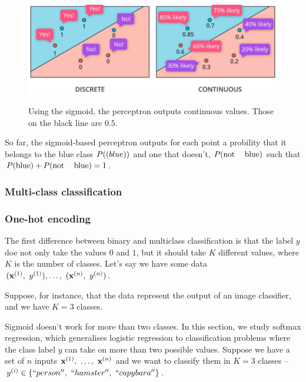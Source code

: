 \documentclass[a4paper]{article}
\begin{document}
\begin{figure}[H]
    \centering
    \includegraphics[height=4.75cm]{img/blue_red_example_valsPNG.PNG}
    \caption{Using the sigmoid, the perceptron outputs continuous values. Those on the black line are $0.5$.}
\end{figure}
So far, the sigmoid-based perceptron outputs for each point a probility that it belongs to the blue class $P(\textup(blue))$ and one that doesn't, $P(\textup{not \;\; blue})$ such that $P(\textup{blue}) + P(\textup{not \;\; blue})=1$.



\subsubsection{Multi-class classification}

\subsubsection{One-hot encoding}

The first difference between binary and multiclass classification is that the label $y$ doe not only take the values $0$ and $1$, but it should take $K$ different values, where $K$ is the number of classes. Let's say we have some data $(\bx^{(1)},\ y^{(1)}), \ldots, \ (\bx^{(n)},\ y^{(n)})$. 

Suppose, for instance, that the data represent the output of an image classifier, and we have $K=3$ classes. 


Sigmoid doesn't work for more than two classes. In this section, we study softmax regression, which generalises logistic regression
to classification problems where the class label $y$ can take on more than two possible values. Suppose we have a set of $n$ inputs $\bx^{(1)},\ \ldots, \ \bx^{(n)}$ and we want to classify them in $K=3$ classes -- $y^{(i)} \in \{``person'',\ ``hamster'',\ ``capybara'' \}$. 
\end{document}
